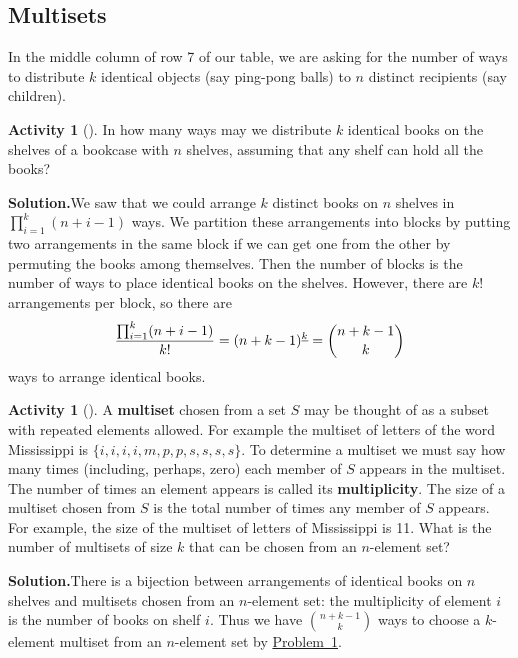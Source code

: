 \documentclass[10pt,]{book}
\newcommand{\terminology}[1]{\textbf{#1}}
\theoremstyle{plain}
\theoremstyle{definition}
\newtheorem{activity}[project]{Activity}
\numberwithin{equation}{chapter}
\begin{document}
\subsection[{Multisets}]{Multisets}\label{subsection-26}
In the middle column of row 7 of our table, we are asking for the number of ways to distribute \(k\) identical objects (say ping-pong balls) to \(n\) distinct recipients (say children).%
\begin{activity}[]\label{identicalbooks}
In how many ways may we distribute \(k\) identical books on the shelves of a bookcase with \(n\) shelves, assuming that any shelf can hold all the books?%
\par\medskip\noindent%
\textbf{Solution.}\quad We saw that we could arrange \(k\) distinct books on \(n\) shelves in \(\prod_{i=1}^k (n+i-1)\) ways. We partition these arrangements into blocks by putting two arrangements in the same block if we can get one from the other by permuting the books among themselves. Then the number of blocks is the number of ways to place identical books on the shelves. However, there are \(k!\) arrangements per block, so there are%
\begin{equation*}
{\prod_{i=1}^k (n+i-1)\over k!}=(n+k-1)^{\underline{k}}= {n+k-1\choose
k}
\end{equation*}
ways to arrange identical books.%
\end{activity}
\begin{activity}[]\label{multiset}
A \terminology{multiset} chosen from a set \(S\) may be thought of as a subset with repeated elements allowed. For example the multiset of letters of the word Mississippi is \(\{i,i,i,i,m,p,p,s,s,s,s\}\). To determine a multiset we must say how many times (including, perhaps, zero) each member of \(S\) appears in the multiset. The number of times an element appears is called its \terminology{multiplicity}. The size of a multiset chosen from \(S\) is the total number of times any member of \(S\) appears. For example, the size of the multiset of letters of Mississippi is 11. What is the number of multisets of size \(k\) that can be chosen from an \(n\)-element set?%
\par\medskip\noindent%
\textbf{Solution.}\quad There is a bijection between arrangements of identical books on \(n\) shelves and multisets chosen from an \(n\)-element set: the multiplicity of element \(i\) is the number of books on shelf \(i\). Thus we have \(n+k-1\choose k\) ways to choose a \(k\)-element multiset from an \(n\)-element set by \hyperref[identicalbooks]{Problem~\ref{identicalbooks}}.%
\end{activity}
\end{document}
